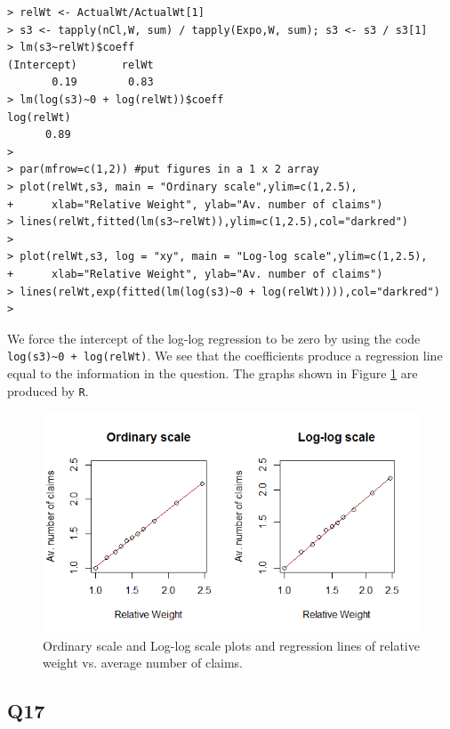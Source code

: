 \documentclass[11pt]{article}
\begin{document}
\begin{verbatim}
> relWt <- ActualWt/ActualWt[1]
> s3 <- tapply(nCl,W, sum) / tapply(Expo,W, sum); s3 <- s3 / s3[1]
> lm(s3~relWt)$coeff
(Intercept)       relWt 
       0.19        0.83 
> lm(log(s3)~0 + log(relWt))$coeff
log(relWt) 
      0.89 
> 
> par(mfrow=c(1,2)) #put figures in a 1 x 2 array
> plot(relWt,s3, main = "Ordinary scale",ylim=c(1,2.5),
+      xlab="Relative Weight", ylab="Av. number of claims")
> lines(relWt,fitted(lm(s3~relWt)),ylim=c(1,2.5),col="darkred")
> 
> plot(relWt,s3, log = "xy", main = "Log-log scale",ylim=c(1,2.5),
+      xlab="Relative Weight", ylab="Av. number of claims")
> lines(relWt,exp(fitted(lm(log(s3)~0 + log(relWt)))),col="darkred")
>
\end{verbatim}

We force the intercept of the log-log regression to be zero by using the code \verb|log(s3)~0 + log(relWt)|. We see that the coefficients produce a regression line equal to the information in the question. The graphs shown in Figure \ref{Figure_Question16} are produced by \verb|R|.
\begin{center}
\begin{figure}[H]

\includegraphics[scale=1]{Q16_OrdinaryAndLogLogScalePlot.png}

\caption{Ordinary scale and Log-log scale plots and regression lines of relative weight vs. average number of claims.}
\label{Figure_Question16}

\end{figure}
\end{center}

\subsection*{Q17}
\end{document}
